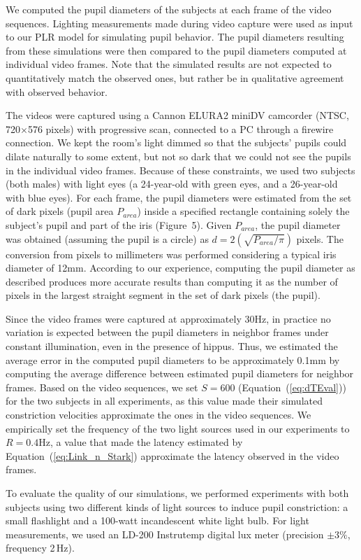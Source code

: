 \documentclass{acmtog} %
\begin{document}
We computed the pupil diameters of the subjects at each frame of the
video sequences. Lighting measurements made during video capture were
used as input to our PLR model for simulating pupil behavior. The pupil
diameters resulting from these simulations were then compared to the
pupil diameters computed at individual video frames. Note that the
simulated results are not expected to quantitatively match the observed
ones, but rather be in qualitative agreement with observed behavior.

The videos were captured using a Cannon ELURA2 miniDV camcorder (NTSC,
720$\times$576 pixels) with progressive scan, connected to a PC through
a firewire connection. We kept the room's light dimmed so that the
subjects' pupils could dilate naturally to some extent, but not so dark
that we could not see the pupils in the individual video frames. Because
of these constraints, we used two subjects (both males) with light eyes
(a 24-year-old with green eyes, and a 26-year-old with blue eyes). For
each frame, the pupil diameters were estimated from the set of dark
pixels (pupil area $P_{area}$) inside a specified rectangle containing
solely the subject's pupil and part of the iris (Figure~5). Given
$P_{area}$, the pupil diameter was obtained (assuming the pupil is a
circle) as $d = 2(\sqrt{P_{area}/\pi})$ pixels. The conversion from
pixels to millimeters was performed considering a typical iris diameter
of 12mm. According to our experience, computing the pupil diameter as
described produces more accurate results than computing it as the number
of pixels in the largest straight segment in the set of dark pixels (the
pupil).

Since the video frames were captured at approximately 30Hz, in practice
no variation is expected between the pupil diameters in neighbor frames
under constant illumination, even in the presence of hippus. Thus, we
estimated the average error in the computed pupil diameters to be
approximately 0.1mm by computing the average difference between
estimated pupil diameters for neighbor frames. Based on the video
sequences, we set $S = 600$ (Equation~(\ref{eq:dTEval})) for the two
subjects in all experiments, as this value made their simulated
constriction velocities approximate the ones in the video sequences. We
empirically set the frequency of the two light sources used in our
experiments to $R = 0.4$Hz, a value that made the latency estimated by
Equation~(\ref{eq:Link_n_Stark}) approximate the latency observed in the
video frames.

To evaluate the quality of our simulations, we performed experiments
with both subjects using two different kinds of light sources to induce
pupil constriction: a small flashlight and a 100-watt incandescent white
light bulb. For light measurements, we used an LD-200 Instrutemp digital
lux meter (precision $\pm3\%$, frequency 2\,Hz).
\end{document}
